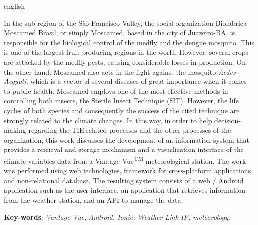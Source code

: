 \begin{resumo}[Abstract]
\begin{otherlanguage*}{english}

In the sub-region of the São Francisco Valley, the social organization Biofábrica Moscamed Brasil, or simply Moscamed, based in the city of Juazeiro-BA, is responsible for the biological control of the medfly and the dengue mosquito. This is one of the largest fruit producing regions in the world. However, several crops are attacked by the medfly pests, causing considerable losses in production. On the other hand, Moscamed also acts in the fight against the mosquito \textit{Aedes Aegypti}, which is a vector of several diseases of great importance when it comes to public health. Moscamed employs one of the most effective methods in controlling both insects, the Sterile Insect Technique (SIT). However, the life cycles of both species and consequently the success of the cited technique are strongly related to the climate changes. In this way, in order to help decision-making regarding the TIE-related processes and the other processes of the organization, this work discusses the development of an information system that provides a retrieval and storage mechanism and a visualization interface of the climate variables data from a Vantage Vue\textsuperscript{TM} meteorological station. The work was performed using web technologies, framework for cross-platform applications and non-relational database. The resulting system consists of a web / Android application such as the user interface, an application that retrieves information from the weather station, and an API to manage the data.
	
	\vspace{\onelineskip}

	\noindent
	\textbf{Key-words}: \textit{Vantage Vue, Android, Ionic, Weather Link IP, meteorology}.

 \end{otherlanguage*}
\end{resumo}


